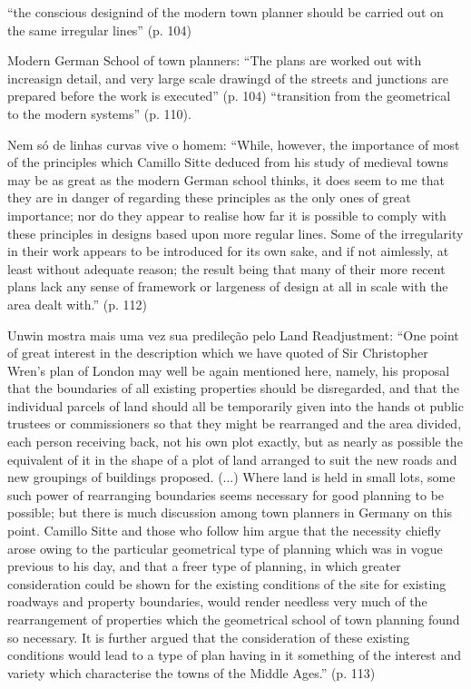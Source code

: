 \documentclass[12pt, a4paper]{book} %
\begin{document}
        ``the conscious designind of the modern town planner should be carried out on the same irregular lines'' (p. 104)

        Modern German School of town planners: ``The plans are worked out with increasign detail, and very large scale drawingd of the streets and junctions are prepared before the work is executed'' (p. 104)
        ``transition from the geometrical to the modern systems'' (p. 110).

        Nem só de linhas curvas vive o homem: ``While, however, the importance of most of the principles which Camillo Sitte deduced from his study of medieval towns may be as great as the modern German school thinks, it does seem to me that they are in danger of regarding these principles as the only ones of great importance; nor do they appear to realise how far it is possible to comply with these principles in designs based upon more regular lines. Some of the irregularity in their work appears to be introduced for its own sake, and if not aimlessly, at least without adequate reason; the result being that many of their more recent plans lack any sense of framework or largeness of design at all in scale with the area dealt with.'' (p. 112)

        Unwin mostra mais uma vez sua predileção pelo Land Readjustment: ``One point of great interest in the description which we have quoted of Sir Christopher Wren's plan of London may well be again mentioned here, namely, his proposal that the boundaries of all existing properties should be disregarded, and that the individual parcels of land should all be temporarily given into the hands ot public trustees or commissioners so that they might be rearranged and the area divided, each person receiving back, not his own plot exactly, but as nearly as possible the equivalent of it in the shape of a plot of land arranged to suit the new roads and new groupings of buildings proposed. (...) Where land is held in small lots, some such power of rearranging boundaries seems necessary for good planning to be possible; but there is much discussion among town planners in Germany on this point. Camillo Sitte and those who follow him argue that the necessity chiefly arose owing to the particular geometrical type of planning which was in vogue previous to his day, and that a freer type of planning, in which greater consideration could be shown for the existing conditions of the site for existing roadways and property boundaries, would render needless very much of the rearrangement of properties which the geometrical school of town planning found so necessary. It is further argued that the consideration of these existing conditions would lead to a type of plan having in it something of the interest and variety which characterise the towns of the Middle Ages.'' (p. 113)
\end{document}

